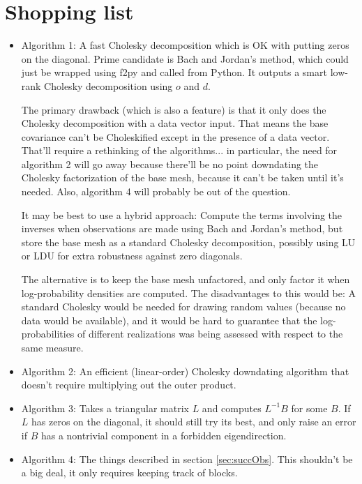 \documentclass{manual}
\begin{document}
\section{Shopping list}\label{sec:shoppingList} 
\begin{itemize}
	\item Algorithm 1: A fast Cholesky decomposition which is OK with putting zeros on the diagonal. Prime candidate is Bach and Jordan's method, which could just be wrapped using f2py and called from Python. It outputs a smart low-rank Cholesky decomposition using $o$ and $d$.
	
	The primary drawback (which is also a feature) is that it only does the Cholesky decomposition with a data vector input. That means the base covariance can't be Choleskified except in the presence of a data vector. That'll require a rethinking of the algorithms... in particular, the need for algorithm 2 will go away because there'll be no point downdating the Cholesky factorization of the base mesh, because it can't be taken until it's needed. Also, algorithm 4 will probably be out of the question.
	
	It may be best to use a hybrid approach: Compute the terms involving the inverses when observations are made using Bach and Jordan's method, but store the base mesh as a standard Cholesky decomposition, possibly using LU or LDU for extra robustness against zero diagonals.
	
	The alternative is to keep the base mesh unfactored, and only factor it when log-probability densities are computed. The disadvantages to this would be: A standard Cholesky would be needed for drawing random values (because no data would be available), and it would be hard to guarantee that the log-probabilities of different realizations was being assessed with respect to the same measure.
	
	\item Algorithm 2: An efficient (linear-order) Cholesky downdating algorithm that doesn't require multiplying out the outer product.
	\item Algorithm 3: Takes a triangular matrix $L$ and computes $L^{-1}B$ for some $B$. If $L$ has zeros on the diagonal, it should still try its best, and only raise an error if $B$ has a nontrivial component in a forbidden eigendirection.
	\item Algorithm 4: The things described in section \ref{sec:succObs}. This shouldn't be a big deal, it only requires keeping track of blocks.


\end{itemize}
\end{document}
